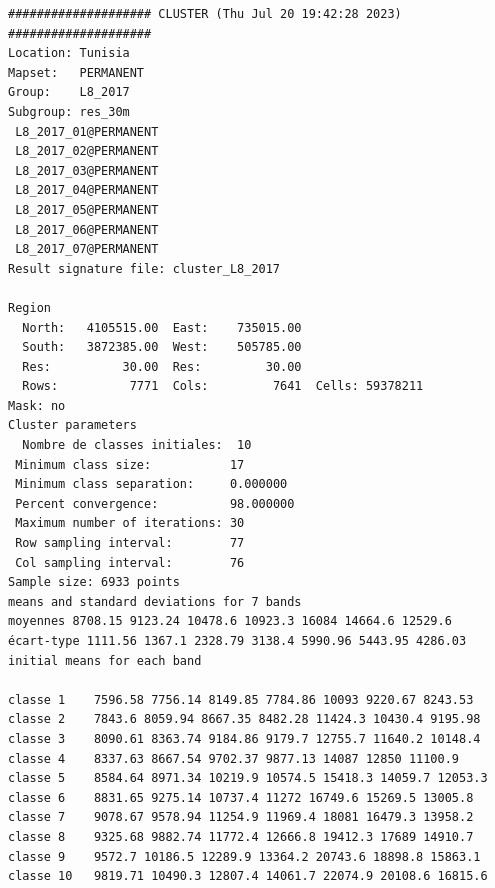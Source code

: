 \documentclass[land,article,submit,pdftex,moreauthors]{Definitions/mdpi}
\begin{document}
\begin{scriptsize}
\begin{verbatim}
#################### CLUSTER (Thu Jul 20 19:42:28 2023) ####################
Location: Tunisia
Mapset:   PERMANENT
Group:    L8_2017
Subgroup: res_30m
 L8_2017_01@PERMANENT
 L8_2017_02@PERMANENT
 L8_2017_03@PERMANENT
 L8_2017_04@PERMANENT
 L8_2017_05@PERMANENT
 L8_2017_06@PERMANENT
 L8_2017_07@PERMANENT
Result signature file: cluster_L8_2017

Region
  North:   4105515.00  East:    735015.00
  South:   3872385.00  West:    505785.00
  Res:          30.00  Res:         30.00
  Rows:          7771  Cols:         7641  Cells: 59378211
Mask: no
Cluster parameters
  Nombre de classes initiales: 	10
 Minimum class size:           17
 Minimum class separation:     0.000000
 Percent convergence:          98.000000
 Maximum number of iterations: 30
 Row sampling interval:        77
 Col sampling interval:        76
Sample size: 6933 points
means and standard deviations for 7 bands
moyennes 8708.15 9123.24 10478.6 10923.3 16084 14664.6 12529.6
écart-type 1111.56 1367.1 2328.79 3138.4 5990.96 5443.95 4286.03
initial means for each band

classe 1    7596.58 7756.14 8149.85 7784.86 10093 9220.67 8243.53
classe 2    7843.6 8059.94 8667.35 8482.28 11424.3 10430.4 9195.98
classe 3    8090.61 8363.74 9184.86 9179.7 12755.7 11640.2 10148.4
classe 4    8337.63 8667.54 9702.37 9877.13 14087 12850 11100.9
classe 5    8584.64 8971.34 10219.9 10574.5 15418.3 14059.7 12053.3
classe 6    8831.65 9275.14 10737.4 11272 16749.6 15269.5 13005.8
classe 7    9078.67 9578.94 11254.9 11969.4 18081 16479.3 13958.2
classe 8    9325.68 9882.74 11772.4 12666.8 19412.3 17689 14910.7
classe 9    9572.7 10186.5 12289.9 13364.2 20743.6 18898.8 15863.1
classe 10   9819.71 10490.3 12807.4 14061.7 22074.9 20108.6 16815.6


\end{verbatim}
\end{scriptsize}
\end{document}
